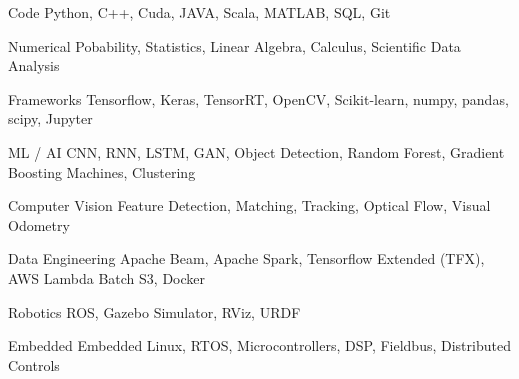 

\begin{cvskills}

\cvskill
    {Code} %
    {Python, C++, Cuda, JAVA, Scala, MATLAB, SQL, Git} %

\cvskill
    {Numerical} %
    {Pobability, Statistics, Linear Algebra, Calculus, Scientific Data Analysis} %


\cvskill
    {Frameworks} %
    {Tensorflow, Keras, TensorRT, OpenCV, Scikit-learn, numpy, pandas, scipy, Jupyter} %

\cvskill
    {ML / AI} %
    {CNN, RNN, LSTM, GAN, Object Detection, Random Forest, Gradient Boosting Machines, Clustering} %

\cvskill
    {Computer Vision} %
    {Feature Detection, Matching, Tracking, Optical Flow, Visual Odometry} %

\cvskill
    {Data Engineering} %
    {Apache Beam, Apache Spark, Tensorflow Extended (TFX), AWS Lambda Batch S3, Docker} %

\cvskill
    {Robotics} %
    {ROS, Gazebo Simulator, RViz, URDF} %

\cvskill
    {Embedded} %
    {Embedded Linux, RTOS, Microcontrollers, DSP, Fieldbus, Distributed Controls} %

\end{cvskills}